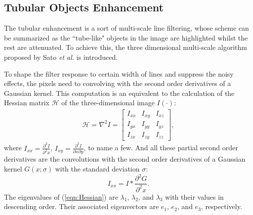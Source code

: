 \subsection{Tubular Objects Enhancement}

The tubular enhancement is a sort of multi-scale line filtering, whose scheme can be summarized as the ``tube-like" objects in the image are highlighted whilst the rest are attenuated. %
To achieve this, the three dimensional multi-scale algorithm proposed by Sato \textit{et al.} \cite{Sato1998} is introduced.

To shape the filter response to certain width of lines and suppress the noisy effects, the pixels need to convolving with the second order derivatives of a Gaussian kernel.
This computation is an equivalent to the calculation of the Hessian matrix $\mathcal{H}$ of the three-dimensional image $I(\cdot)$:
\begin{gather}
\label{eqn:Hessian}
\mathcal{H} = \nabla^2 I =
\begin{bmatrix}
I_{xx} & I_{xy} & I_{xz} \\ I_{yx} & I_{yy} & I_{yz} \\ I_{zx} & I_{zy} & I_{zz}
\end{bmatrix},
\end{gather}
where $I_{xx} = \frac{\partial^2 I}{\partial^2 x}$, $I_{xy} = \frac{\partial^2 I}{\partial x \partial y}$, to name a few.
And all these partial second order derivatives are the convolutions with the second order derivatives of a Gaussian kernel $G(x; \sigma)$ with the standard deviation $\sigma$:
\begin{equation}
\label{GaussianConvolution}
I_{xx} = I \ast \frac{\partial^2 G}{\partial^2 x}.
\end{equation}
The eigenvalues of (\ref{eqn:Hessian}) are $\lambda_1$, $\lambda_2$, and $\lambda_3$ with their values in descending order.
Their associated eigenvectors are $e_1$, $e_2$, and $e_3$, respectively.

